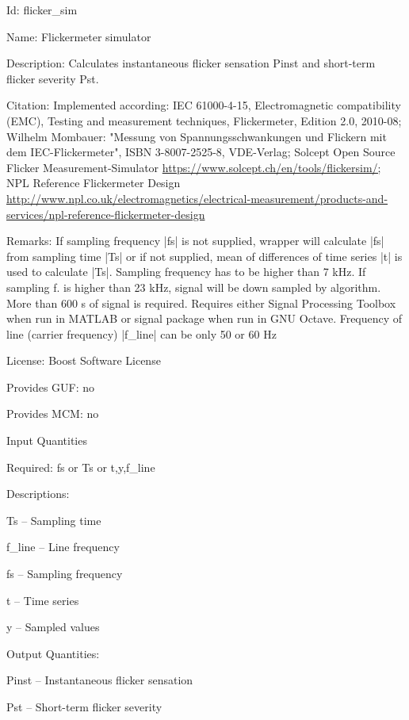 \begin{tightdesc}
\item [Id:] flicker\_sim
\item [Name:] Flickermeter simulator
\item [Description:] Calculates instantaneous flicker sensation Pinst and short-term flicker severity Pst.
\item [Citation:] Implemented according: IEC 61000-4-15, Electromagnetic compatibility (EMC), Testing and measurement techniques, Flickermeter, Edition 2.0, 2010-08; Wilhelm Mombauer: "Messung von Spannungsschwankungen und Flickern mit dem IEC-Flickermeter", ISBN 3-8007-2525-8, VDE-Verlag; Solcept Open Source Flicker Measurement-Simulator \url{https://www.solcept.ch/en/tools/flickersim/;} NPL Reference Flickermeter Design \url{http://www.npl.co.uk/electromagnetics/electrical-measurement/products-and-services/npl-reference-flickermeter-design}
\item [Remarks:] If sampling frequency |fs| is not supplied, wrapper will calculate |fs| from sampling time |Ts| or if not supplied, mean of differences of time series |t| is used to calculate |Ts|. Sampling frequency has to be higher than 7 kHz. If sampling f. is higher than 23 kHz, signal will be down sampled by algorithm. More than 600 s of signal is required. Requires either Signal Processing Toolbox when run in MATLAB or signal package when run in GNU Octave. Frequency of line (carrier frequency) |f\_line| can be only 50 or 60 Hz
\item [License:] Boost Software License
\item [Provides GUF:] no
\item [Provides MCM:] no
\item [Input Quantities] \rule{0em}{0em}
    \begin{tightdesc}
    \item [Required:] 
        \textsf{fs} or \textsf{Ts} or \textsf{t},\enspace \textsf{y},\enspace \textsf{f\_line}
    \item [Descriptions:] \rule{0em}{0em}
        \begin{tightdesc}
            \item[\textsf{Ts}] -- Sampling time
            \item[\textsf{f\_line}] -- Line frequency
            \item[\textsf{fs}] -- Sampling frequency
            \item[\textsf{t}] -- Time series
            \item[\textsf{y}] -- Sampled values
        \end{tightdesc}
    \end{tightdesc}
\item [Output Quantities:] \rule{0em}{0em}
    \begin{tightdesc}
        \item[\textsf{Pinst}] -- Instantaneous flicker sensation
        \item[\textsf{Pst}] -- Short-term flicker severity
    \end{tightdesc}
\end{tightdesc}
